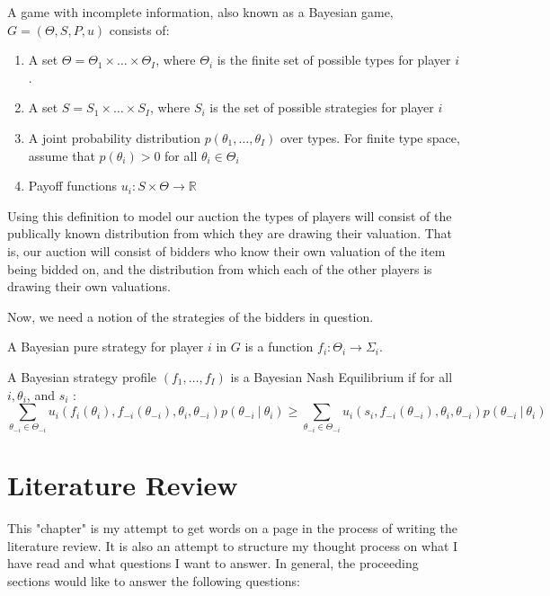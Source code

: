 \documentclass[12pt,twoside]{reedthesis}
\begin{document}
\begin{dfn}
	A game with incomplete information, also known as a Bayesian game, $G = (\Theta, S, P, u)$ consists of:
	\begin{enumerate}
		\item A set $\Theta = \Theta_1 \times \ldots \times \Theta_I$, where $\Theta_i$ is the finite set of possible types for player $i$.
		\item A set $S = S_1 \times \ldots \times S_I$, where $S_i$ is the set of possible strategies for player $i$
		\item A joint probability distribution $p(\theta_1, \dots , \theta_I)$ over types. For finite type space, assume that $p(\theta_i) > 0$ for all $\theta_i \in \Theta_i$
		\item Payoff functions $u_i : S \times \Theta \rightarrow \mathbb{R}$
	\end{enumerate} 
\end{dfn}

Using this definition to model our auction the types of players will consist of the publically known distribution from which they are drawing their valuation. That is, our auction will consist of bidders who know their own valuation of the item being bidded on, and the distribution from which each of the other players is drawing their own valuations.

Now, we need a notion of the strategies of the bidders in question. 

\begin{dfn}
	A Bayesian pure strategy for player $i$ in $G$ is a function $f_i : \Theta_i \rightarrow \Sigma_i$. 
\end{dfn}

\begin{dfn}
	A Bayesian strategy profile $(f_1, \ldots, f_I)$ is a Bayesian Nash Equilibrium if for all $i, \theta_i$, and $s_i$ :
	$$ \sum_{\theta_{-i} \in \Theta_{-i}} u_i(f_i(\theta_i), f_{-i}(\theta_{-i}), \theta_i, \theta_{-i})p(\theta_{-i} \ | \ \theta_i) \geq \sum_{\theta_{-i} \in \Theta_{-i}} u_i(s_i, f_{-i}(\theta_{-i}), \theta_i, \theta_{-i})p(\theta_{-i} \ | \ \theta_i)$$
\end{dfn}

 
\chapter{Literature Review}
	This "chapter" is my attempt to get words on a page in the process of writing the literature review. It is also an attempt to structure my thought process on what I have read and what questions I want to answer. In general, the proceeding sections would like to answer the following questions:
	
\end{document}
